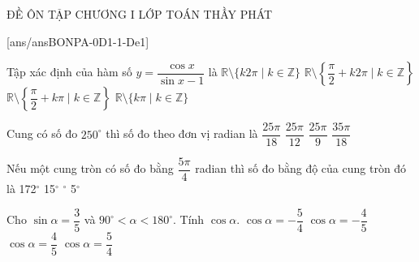 \setcounter{deso}{0}
\begin{name}
	{\tenchude}
	{ĐỀ ÔN TẬP CHƯƠNG I}
	{LỚP TOÁN THẦY PHÁT}
	{\thoigian}
\end{name}
\TN
{}[ans/ansBONPA-0D1-1-De1]
\begin{ex} %
	Tập xác định của hàm số $y = \dfrac{\cos x}{\sin x - 1}$ là
	\choice
	{$\mathbb{R} \setminus \{k2\pi \mid k \in \mathbb{Z}\}$}
	{\True $\mathbb{R} \setminus \left\{ \dfrac{\pi}{2} + k2\pi \mid k \in \mathbb{Z} \right\}$}
	{$\mathbb{R} \setminus \left\{ \dfrac{\pi}{2} + k\pi \mid k \in \mathbb{Z} \right\}$}
	{$\mathbb{R} \setminus \{k\pi \mid k \in \mathbb{Z}\}$}
\end{ex}

\begin{ex} %
	Cung có số đo $250^\circ$ thì số đo theo đơn vị radian là
	\choice
	{\True $\dfrac{25\pi}{18}$}
	{$\dfrac{25\pi}{12}$}
	{$\dfrac{25\pi}{9}$}
	{$\dfrac{35\pi}{18}$}
\end{ex}

\begin{ex} %
	Nếu một cung tròn có số đo bằng $\dfrac{5\pi}{4}$ radian thì số đo bằng độ của cung tròn đó là
	\choice
	{172$^\circ$}
	{15$^\circ$}
	{$^\circ$}
	{5$^\circ$}
\end{ex}

\begin{ex} %
	Cho $\sin \alpha = \dfrac{3}{5}$ và $90^\circ < \alpha < 180^\circ$. Tính $\cos \alpha$.
	\choice
	{$\cos \alpha = -\dfrac{5}{4}$}
	{\True $\cos \alpha = -\dfrac{4}{5}$}
	{$\cos \alpha = \dfrac{4}{5}$}
	{$\cos \alpha = \dfrac{5}{4}$}
\end{ex}

